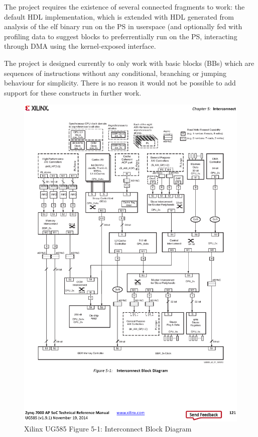 \documentclass[a4paper]{article}
\begin{document}
The project requires the existence of several connected fragments to work: the default HDL implementation, which is extended with HDL generated from analysis of the elf binary run on the PS in userspace (and optionally fed with profiling data to suggest blocks to preferrentially run on the PS, interacting through DMA using the kernel-exposed interface.

The project is designed currently to only work with basic blocks (BBs) which are sequences of instructions without any conditional, branching or jumping behaviour for simplicity. There is no reason it would not be possible to add support for these constructs in further work.

\begin{figure}[p]
  \includegraphics[width=1.4\textwidth,center]{fig/interconnect-block.eps}
  \caption{Xilinx UG585\cite{ug585} Figure 5-1: Interconnect Block Diagram}
  \label{fig:inter-block}
\end{figure}
\end{document}
